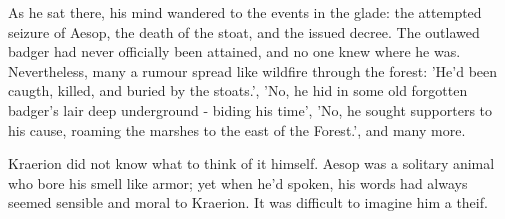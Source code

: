 As he sat there, his mind wandered to the events in the glade: the attempted seizure of Aesop, the death of the stoat, and the issued decree. The outlawed badger had never officially been attained, and no one knew where he was. Nevertheless, many a rumour spread like wildfire through the forest: 'He'd been caugth, killed, and buried by the stoats.', 'No, he hid in some old forgotten badger's lair deep underground - biding his time', 'No, he sought supporters to his cause, roaming the marshes to the east of the Forest.', and many more.

Kraerion did not know what to think of it himself. Aesop was a solitary animal who bore his smell like armor; yet when he'd spoken, his words had always seemed sensible and moral to Kraerion. It was difficult to imagine him a theif.





